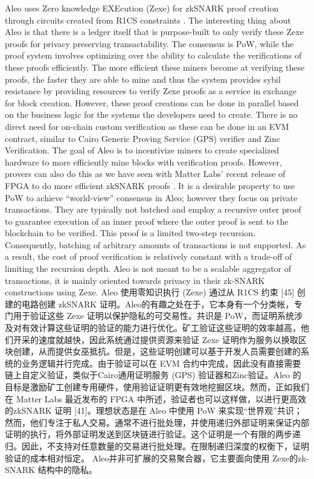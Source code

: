 \documentclass{ctexart}
\begin{document}
Aleo uses Zero knowledge EXEcution (Zexe) for zkSNARK proof creation through circuits created from R1CS constraints \cite{aleo21}. The interesting thing about Aleo is that there is a ledger itself that is purpose-built to only verify these Zexe proofs for privacy preserving transactability. The consensus is PoW, while the proof system involves optimizing over the ability to calculate the verifications of these proofs efficiently. The more efficient these miners become at verifying these proofs, the faster they are able to mine and thus the system provides sybil resistance by providing resources to verify Zexe proofs as a service in exchange for block creation. However, these proof creations can be done in parallel based on the business logic for the systems the developers need to create. There is no direct need for on-chain custom verification as these can be done in an EVM contract, similar to Cairo Generic Proving Service (GPS) verifier and Zinc Verification. The goal of Aleo is to incentivize miners to create specialized hardware to more efficiently mine blocks with verification proofs. However, provers can also do this as we have seen with Matter Labs’ recent release of FPGA to do more efficient zkSNARK proofs \cite{Glu20}. It is a desirable property to use PoW to achieve “world-view” consensus in Aleo; however they focus on private transactions. They are typically not batched and employ a recursive outer proof to guarantee execution of an inner proof where the outer proof is sent to the blockchain to be verified. This proof is a limited two-step recursion. Consequently, batching of arbitrary amounts of transactions is not supported. As a result, the cost of proof verification is relatively constant with a trade-off of limiting the recursion depth. Aleo is not meant to be a scalable aggregator of transactions, it is mainly oriented towards privacy in their zk-SNARK constructions using Zexe. Aleo 使用零知识执行 (Zexe) 通过从 R1CS 约束 [45] 创建的电路创建 zkSNARK 证明。Aleo的有趣之处在于，它本身有一个分类帐，专门用于验证这些 Zexe 证明以保护隐私的可交易性。共识是 PoW，而证明系统涉及对有效计算这些证明的验证的能力进行优化。矿工验证这些证明的效率越高，他们开采的速度就越快，因此系统通过提供资源来验证 Zexe 证明作为服务以换取区块创建，从而提供女巫抵抗。但是，这些证明创建可以基于开发人员需要创建的系统的业务逻辑并行完成。由于验证可以在 EVM 合约中完成，因此没有直接需要链上自定义验证，类​​似于Cairo通用证明服务 (GPS) 验证器和Zinc验证。Aleo 的目标是激励矿工创建专用硬件，使用验证证明更有效地挖掘区块。然而，正如我们在 Matter Labs 最近发布的 FPGA 中所述，验证者也可以这样做，以进行更高效的zkSNARK 证明 [41]。理想状态是在 Aleo 中使用 PoW 来实现“世界观”共识；然而，他们专注于私人交易。通常不进行批处理，并使用递归外部证明来保证内部证明的执行，将外部证明发送到区块链进行验证。这个证明是一个有限的两步递归。因此，不支持对任意数量的交易进行批处理。在限制递归深度的权衡下，证明验证的成本相对恒定。 Aleo并非可扩展的交易聚合器，它主要面向使用 Zexe的zk-SNARK 结构中的隐私。
\end{document}

